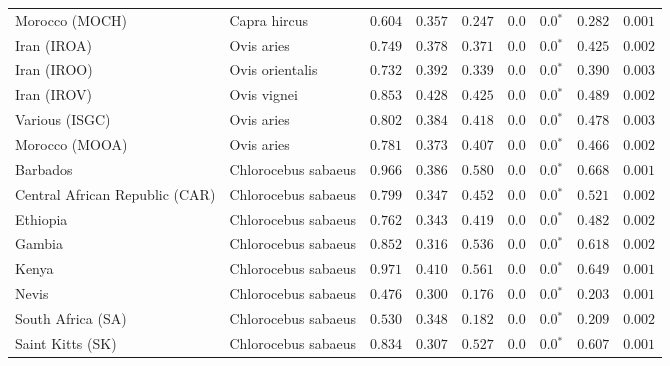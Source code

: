 \begin{center}
\begin{adjustbox}{width = 1\textwidth}
\begin{tabular}{|l|l|r|r|r|r|r|r|r|}
            Morocco (MOCH)                    & Capra hircus     & $ 0.604$ & $ 0.357$ & $ 0.247$ & $0.0$    & $\bm{0.0{^*}}$ & $ 0.282$ & $ 0.001$ \\
            Iran (IROA)                    & Ovis aries         & $ 0.749$ & $ 0.378$ & $ 0.371$ & $0.0$    & $\bm{0.0{^*}}$ & $ 0.425$ & $ 0.002$ \\
            Iran (IROO)                 & Ovis orientalis          & $ 0.732$ & $ 0.392$ & $ 0.339$ & $0.0$    & $\bm{0.0{^*}}$ & $ 0.390$ & $ 0.003$ \\
            Iran (IROV)                 & Ovis vignei          & $ 0.853$ & $ 0.428$ & $ 0.425$ & $0.0$    & $\bm{0.0{^*}}$ & $ 0.489$ & $ 0.002$ \\
            Various (ISGC)                       & Ovis aries & $ 0.802$ & $ 0.384$ & $ 0.418$ & $0.0$    & $\bm{0.0{^*}}$ & $ 0.478$ & $ 0.003$ \\
            Morocco (MOOA) & Ovis aries & $ 0.781$ & $ 0.373$ & $ 0.407$ & $0.0$ & $\bm{0.0{^*}}$ & $ 0.466$ & $ 0.002$ \\
            Barbados                       & Chlorocebus sabaeus & $ 0.966$ & $ 0.386$ & $ 0.580$ & $0.0$    & $\bm{0.0{^*}}$ & $ 0.668$ & $ 0.001$ \\
            Central African Republic (CAR)                         & Chlorocebus sabaeus & $ 0.799$ & $ 0.347$ & $ 0.452$ & $0.0$    & $\bm{0.0{^*}}$ & $ 0.521$ & $ 0.002$ \\
            Ethiopia                          & Chlorocebus sabaeus & $ 0.762$ & $ 0.343$ & $ 0.419$ & $0.0$    & $\bm{0.0{^*}}$ & $ 0.482$ & $ 0.002$ \\
            Gambia                          & Chlorocebus sabaeus & $ 0.852$ & $ 0.316$ & $ 0.536$ & $0.0$    & $\bm{0.0{^*}}$ & $ 0.618$ & $ 0.002$ \\
            Kenya              & Chlorocebus sabaeus & $ 0.971$ & $ 0.410$ & $ 0.561$ & $0.0$    & $\bm{0.0{^*}}$ & $ 0.649$ & $ 0.001$ \\
            Nevis               & Chlorocebus sabaeus & $ 0.476$ & $ 0.300$ & $ 0.176$ & $0.0$    & $\bm{0.0{^*}}$ & $ 0.203$ & $ 0.001$ \\
            South Africa (SA)                         & Chlorocebus sabaeus & $ 0.530$ & $ 0.348$ & $ 0.182$ & $0.0$    & $\bm{0.0{^*}}$ & $ 0.209$ & $ 0.002$ \\
            Saint Kitts (SK)                  & Chlorocebus sabaeus        & $ 0.834$ & $ 0.307$ & $ 0.527$ & $0.0$ & $\bm{0.0{^*}}$     & $ 0.607$ & $ 0.001$ \\

\end{tabular}
\end{adjustbox}
\end{center}
